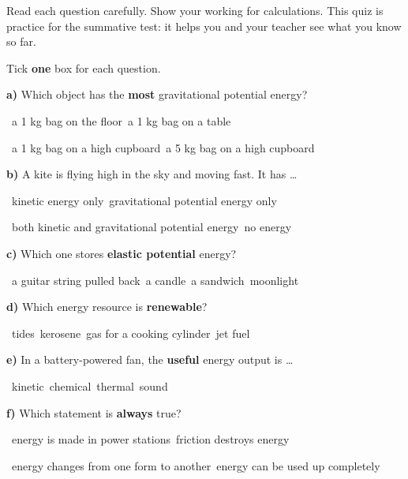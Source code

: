 \documentclass[12pt,a4paper]{article}
\newcommand{\opt}[1]{\cb\ #1\hspace{6mm}}
\begin{document}
\thispagestyle{first}
\namerow

\begin{info}
Read each question carefully. Show your working for calculations. This quiz is practice for the summative test: it helps you and your teacher see what you know so far.
\end{info}

 Tick \textbf{one} box for each question. \par
\textbf{a)} Which object has the \textbf{most} gravitational potential energy?\par
\opt{a 1 kg bag on the floor}\opt{a 1 kg bag on a table}\par\opt{a 1 kg bag on a high cupboard}\opt{a 5 kg bag on a high cupboard}\par\vspace{4pt}
\textbf{b)} A kite is flying high in the sky and moving fast. It has …\par
\opt{kinetic energy only}\opt{gravitational potential energy only}\par\opt{both kinetic and gravitational potential energy}\opt{no energy}\par\vspace{4pt}
\textbf{c)} Which one stores \textbf{elastic potential} energy?\par
\opt{a guitar string pulled back}\opt{a candle}\opt{a sandwich}\opt{moonlight}\par\vspace{4pt}
\textbf{d)} Which energy resource is \textbf{renewable}?\par
\opt{tides}\opt{kerosene}\opt{gas for a cooking cylinder}\opt{jet fuel}\par\vspace{4pt}
\textbf{e)} In a battery-powered fan, the \textbf{useful} energy output is …\par
\opt{kinetic}\opt{chemical}\opt{thermal}\opt{sound}\par\vspace{4pt}
\textbf{f)} Which statement is \textbf{always} true?\par
\opt{energy is made in power stations}\opt{friction destroys energy}\par\opt{energy changes from one form to another}\opt{energy can be used up completely}
\end{document}
